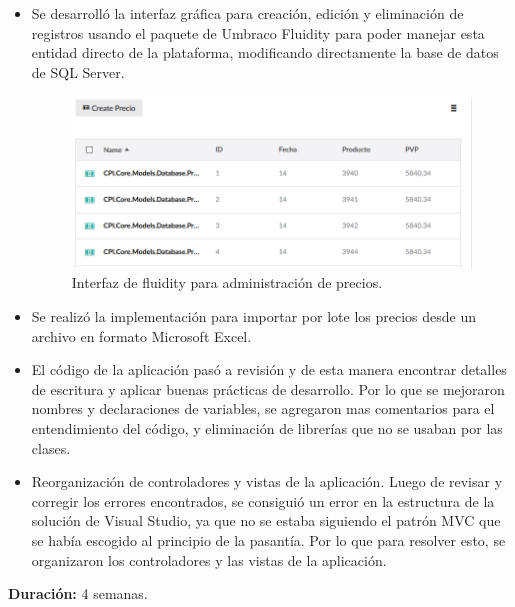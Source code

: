 \begin{itemize}
  \item Se desarrolló la interfaz gráfica para creación, edición y eliminación de registros usando el paquete de Umbraco Fluidity para poder manejar esta entidad directo de la plataforma, modificando directamente la base de datos de SQL Server.
  \begin{figure}[H]
    \begin{center}
    \includegraphics[scale=0.6]{precios.png}
    \caption{Interfaz de fluidity para administración de precios.}
    \label{fig:prices}
    \end{center}
    \end{figure}
  \item Se realizó la implementación para importar por lote los precios desde un archivo en formato Microsoft Excel.
  \item El código de la aplicación pasó a revisión y de esta manera encontrar detalles de escritura y aplicar buenas prácticas de desarrollo. Por lo que se mejoraron nombres y declaraciones de variables, se agregaron mas comentarios para el entendimiento del código, y eliminación de librerías que no se usaban por las clases.
  \item Reorganización de controladores y vistas de la aplicación. Luego de revisar y corregir los errores encontrados, se consiguió un error en la estructura de la solución de Visual Studio, ya que no se estaba siguiendo el patrón MVC que se había escogido al principio de la pasantía. Por lo que para resolver esto, se organizaron los controladores y las vistas de la aplicación.
\end{itemize}

\textbf{Duración:} 4 semanas.

